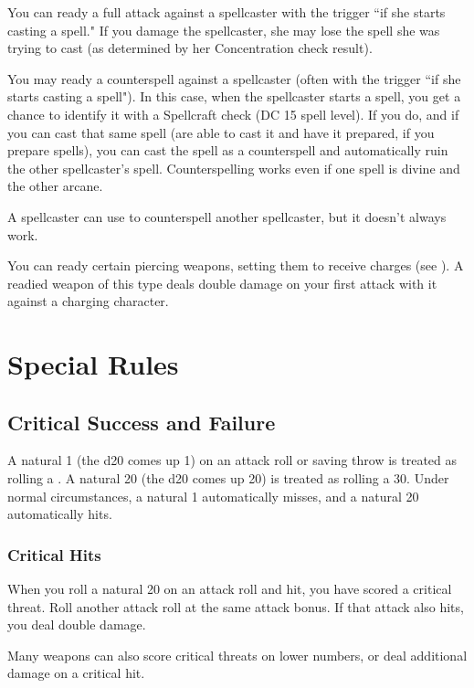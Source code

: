  You can ready a full attack against a spellcaster with the trigger ``if she starts casting a spell." If you damage
the spellcaster, she may lose the spell she was trying to cast (as determined by her Concentration check result).

 You may ready a counterspell against a spellcaster (often with the trigger ``if she starts casting a spell"). In this case, when the spellcaster starts a spell, you get a chance to identify it with a Spellcraft check (DC 15 \add spell level). If you do, and if you can cast that same spell (are able to cast it and have it prepared, if you prepare spells), you can cast the spell as a counterspell and automatically ruin the other spellcaster's spell. Counterspelling works even if one spell is divine and the other arcane.

A spellcaster can use  to counterspell another spellcaster, but it doesn't always work.

 You can ready certain piercing weapons, setting them to receive charges (see ). A readied weapon of this type deals double damage on your first attack with it against a charging character.

\section{Special Rules}\label{Special Rules}

\subsection{Critical Success and Failure}\label{Critical Success and Failure}
A natural 1 (the d20 comes up 1) on an attack roll or saving throw is treated as rolling a . A natural 20 (the d20 comes up 20) is treated as rolling a 30. Under normal circumstances, a natural 1 automatically misses, and a natural 20 automatically hits.

\subsubsection{Critical Hits}\label{Critical Hits}
When you roll a natural 20 on an attack roll and hit, you have scored a critical threat. Roll another attack roll at the same attack bonus. If that attack also hits, you deal double damage.

Many weapons can also score critical threats on lower numbers, or deal additional damage on a critical hit.

